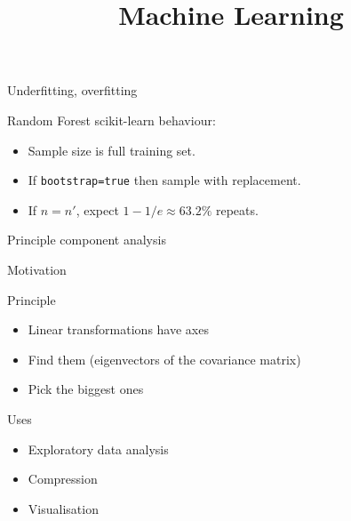 
\title
{Machine Learning}
\subtitle{}





\begin{frame}{Underfitting, overfitting}
\end{frame}

\begin{frame}{Random Forest}
  scikit-learn behaviour:
  \begin{itemize}
  \item Sample size is full training set.
  \item If \texttt{bootstrap=true} then sample with replacement.
  \item If $n=n'$, expect $1-1/e \approx 63.2\%$ repeats.
  \end{itemize}
\end{frame}




\begin{frame}{Principle component analysis}

\end{frame}

\begin{frame}{Motivation}
\end{frame}

\begin{frame}[t]{Principle}

  \vspace{1cm}
  \begin{itemize}
  \item Linear transformations have axes
  \item Find them (eigenvectors of the covariance matrix)
  \item Pick the biggest ones
  \end{itemize}

  \vspace{5mm}
\end{frame}

\begin{frame}{Uses}
  \begin{itemize}
  \item Exploratory data analysis
  \item Compression
  \item Visualisation
  \end{itemize}
\end{frame}


